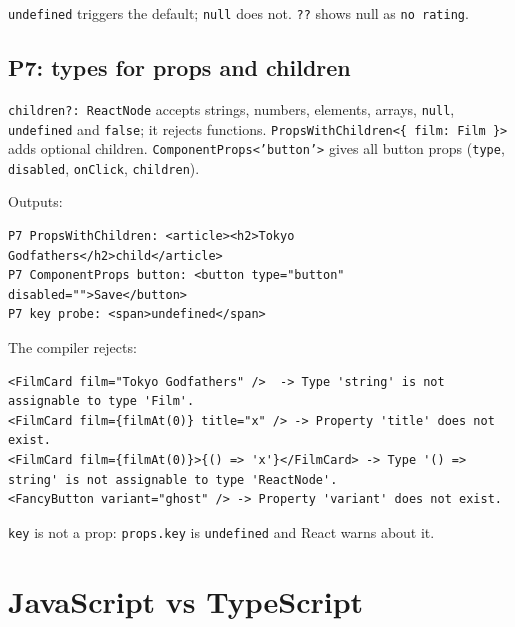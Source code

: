 \documentclass[
  11pt,
]{article}
\begin{document}
\texttt{undefined} triggers the default;
\texttt{null} does not. \texttt{??}
shows null as \texttt{no rating}.

\subsection{P7: types for props and
children}\label{p7-types-for-props-and-children}

\texttt{children?: ReactNode} accepts strings, numbers,
elements, arrays, \texttt{null},
\texttt{undefined} and \texttt{false};
it rejects functions.
\texttt{PropsWithChildren\textless{}\{ film: Film \}\textgreater{}} adds
optional children. \texttt{ComponentProps\textless{}'button'\textgreater{}}
gives all button props (\texttt{type},
\texttt{disabled}, \texttt{onClick},
\texttt{children}).

Outputs:

\begin{lstlisting}
P7 PropsWithChildren: <article><h2>Tokyo Godfathers</h2>child</article>
P7 ComponentProps button: <button type="button" disabled="">Save</button>
P7 key probe: <span>undefined</span>
\end{lstlisting}

The compiler rejects:

\begin{lstlisting}
<FilmCard film="Tokyo Godfathers" />  -> Type 'string' is not assignable to type 'Film'.
<FilmCard film={filmAt(0)} title="x" /> -> Property 'title' does not exist.
<FilmCard film={filmAt(0)}>{() => 'x'}</FilmCard> -> Type '() => string' is not assignable to type 'ReactNode'.
<FancyButton variant="ghost" /> -> Property 'variant' does not exist.
\end{lstlisting}

\texttt{key} is not a prop:
\texttt{props.key} is
\texttt{undefined} and React warns about it.

\section{JavaScript vs TypeScript}\label{javascript-vs-typescript}
\end{document}
